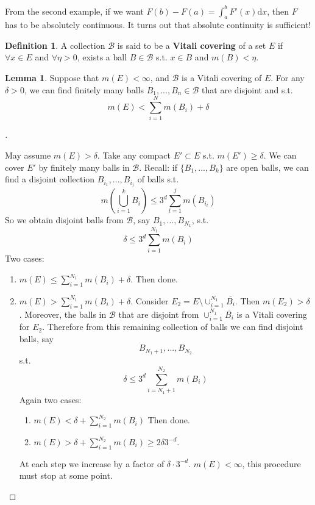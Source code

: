 \documentclass{article}
\theoremstyle{definition}
\theoremstyle{definition}
\newtheorem{lem}{Lemma}
\newtheorem{dfn}{Definition}
\newenvironment{proofs}[1][\proofname]{%
  \begin{proof}[#1]$ $\par\nobreak\ignorespaces
}{%
  \end{proof}
}
\begin{document}
From the second example, if  we want $F(b) - F(a) = \int_a^b F'(x) \mathrm{d} x$, then $F$ has to be absolutely continuous. It turns out that absolute continuity is sufficient!

\begin{dfn}
	A collection $\mathcal{B}$ is said to be a \textbf{Vitali covering} of a set $E$ if $\forall x \in E$ and $\forall \eta > 0$, exists a ball $B \in \mathcal{B}$ s.t. $x \in B$ and $m(B) < \eta$. 
\end{dfn}

\begin{lem}
  Suppose that $m(E) < \infty$, and $\mathcal{B}$ is a Vitali covering of $E$. For any $\delta > 0$, we can find finitely many balls $B_1, ...,B_n \in \mathcal{B}$ that are disjoint and s.t.
  \[
    m(E) < \sum_{i = 1}^N m(B_i) + \delta
  \]
\end{lem}

\begin{proofs}
  May assume $m(E) > \delta$. Take any compact $E' \subset E$ s.t. $m(E') \geq \delta$. We can cover $E'$ by finitely many balls in $\mathcal{B}$. Recall: if $\{B_1, ..., B_k\}$ are open balls, we can find a disjoint collection $B_{i_1}, ..., B_{i_j}$ of balls s.t.
  \[
    m\left(\bigcup_{i = 1}^k B_i\right) \leq 3^d \sum_{l = 1}^j m(B_{i_l})
  \]
  So we obtain disjoint balls from $\mathcal{B}$, say $B_1, ..., B_{N_1}$, s.t.
  \[
    \delta \leq 3^d \sum_{i = 1}^{N_1} m(B_i)
  \]
  Two cases:
  \begin{enumerate}
    \item $m(E) \leq \sum_{i = 1}^{N_1} m(B_i) + \delta$. Then done.
    \item $m(E) > \sum_{i = 1}^{N_1} m(B_i) + \delta$. Consider $E_2 = E \setminus \cup_{i = 1}^{N_1} \overline{B_i}$. Then $m(E_2) > \delta$. Moreover, the balls in $\mathcal{B}$ that are disjoint from $\cup_{i = 1}^{N_1} \overline{B_i}$ is a Vitali covering for $E_2$. Therefore from this remaining collection of balls we can find disjoint balls, say
      \[
        B_{N_1 + 1}, ..., B_{N_2}
      \]
      s.t.
      \[
        \delta \leq 3^d \sum_{i = N_1 + 1}^{N_2} m(B_i)
      \]
      Again two cases:
      
      \begin{enumerate}
        \item $m(E) < \delta + \sum_{i =1}^{N_2} m(B_i)$ Then done.
        \item $m(E) > \delta + \sum_{i = 1}^{N_2} m(B_i) \geq 2 \delta 3^{-d}$. 
      \end{enumerate}

      At each step we increase by a factor of $\delta \cdot 3^{-d}$. $m(E) < \infty$, this procedure must stop at some point. 
  \end{enumerate}
\end{proofs}
\end{document}
